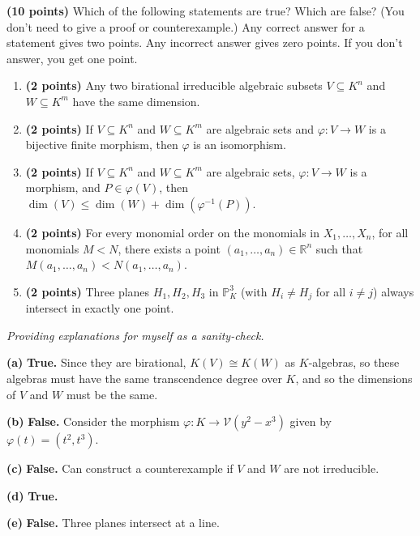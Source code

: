 \documentclass[11pt,letterpaper]{article}
\begin{document}
\begin{problem}
    \textbf{(10 points)} Which of the following statements are true? Which are false? (You don't need to give a proof or counterexample.) Any correct answer for a statement gives two points. Any incorrect answer gives zero points. If you don't answer, you get one point.
    \begin{enumerate}[label=(\alph*)]
        \item \textbf{(2 points)} Any two birational irreducible algebraic subsets $V\subseteq K^n$ and $W\subseteq K^m$ have the same dimension.
        \item \textbf{(2 points)} If $V\subseteq K^n$ and $W\subseteq K^m$ are algebraic sets and $\varphi:V\rightarrow W$ is a bijective finite morphism, then $\varphi$ is an isomorphism.
        \item \textbf{(2 points)} If $V\subseteq K^n$ and $W\subseteq K^m$ are algebraic sets, $\varphi:V\rightarrow W$ is a morphism, and $P\in\varphi(V)$, then $\dim(V)\leq \dim(W) + \dim(\varphi^{-1}(P))$.
        \item \textbf{(2 points)} For every monomial order on the monomials in $X_1,\dots,X_n$, for all monomials $M<N$, there exists a point $(a_1,\dots,a_n)\in\mathbb R^n$ such that $M(a_1,\dots,a_n)<N(a_1,\dots,a_n)$.
        \item \textbf{(2 points)} Three planes $H_1,H_2,H_3$ in $\mathbb P^3_K$ (with $H_i\neq H_j$ for all $i\neq j$) always intersect in exactly one point.
    \end{enumerate}
\end{problem}

\begin{solution}
    \textit{Providing explanations for myself as a sanity-check.}

    \textbf{(a)} \textbf{True.} Since they are birational, $K(V)\cong K(W)$ as $K$-algebras, so these algebras must have the same transcendence degree over $K$, and so the dimensions of $V$ and $W$ must be the same.

    \textbf{(b)} \textbf{False.} Consider the morphism $\varphi : K \to \mathcal{V}(y^2-x^3)$ given by $\varphi(t) = (t^2, t^3)$.

    \textbf{(c)} \textbf{False.} Can construct a counterexample if $V$ and $W$ are not irreducible.

    \textbf{(d)} \textbf{True.}

    \textbf{(e)} \textbf{False.} Three planes intersect at a line.
\end{solution}
\end{document}
